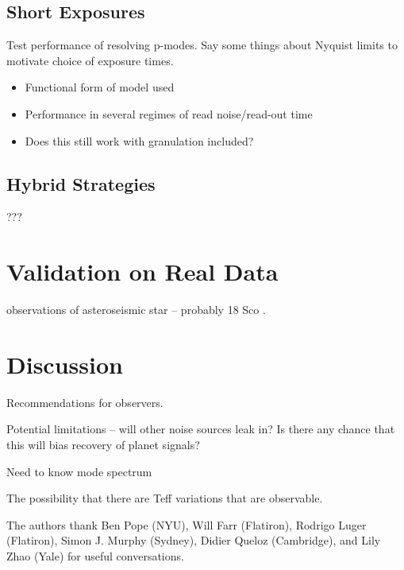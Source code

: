 \documentclass[modern]{aastex62}
\begin{document}
\subsection{Short Exposures}

Test performance of resolving p-modes. Say some things about Nyquist limits to motivate choice of exposure times.

\begin{itemize}
\item Functional form of model used
\item Performance in several regimes of read noise/read-out time
\item Does this still work with granulation included?
\end{itemize}

\subsection{Hybrid Strategies}

???

\section{Validation on Real Data}

\HARPS observations of asteroseismic star -- probably 18 Sco \citep{Bazot2012}.

\section{Discussion}

Recommendations for observers.

Potential limitations -- will other noise sources leak in? Is there any chance that this will bias recovery of planet signals?

Need to know mode spectrum

The possibility that there are Teff variations that are observable.

\acknowledgements

The authors thank
  Ben Pope (NYU),
  Will Farr (Flatiron),
  Rodrigo Luger (Flatiron),
  Simon J. Murphy (Sydney),
  Didier Queloz (Cambridge), and
  Lily Zhao (Yale)
for useful conversations.



\clearpage


\end{document}
